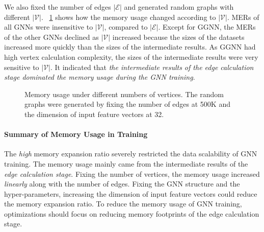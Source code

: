 We also fixed the number of edges $|\mathcal{E}|$ and generated random graphs with different $|\mathcal{V}|$.
%
\figurename~\ref{fig:exp_memory_expansion_ratio_input_graph_number_of_vertices_fixed_edge} shows how the memory usage changed according to $|\mathcal{V}|$.
%
MERs of all GNNs were insensitive to $|\mathcal{V}|$, compared to $|\mathcal{E}|$.
%
Except for GGNN, the MERs of the other GNNs declined as $|\mathcal{V}|$ increased because the sizes of the datasets increased more quickly than the sizes of the intermediate results.
%
As GGNN had high vertex calculation complexity, the sizes of the intermediate results were very sensitive to $|\mathcal{V}|$.
%
It indicated that \emph{the intermediate results of the edge calculation stage dominated the memory usage during the GNN training}.

\begin{figure}[H]
    \centering
    \caption{Memory usage under different numbers of vertices. The random graphs were generated by fixing the number of edges at 500K and the dimension of input feature vectors at 32.}
    \label{fig:exp_memory_expansion_ratio_input_graph_number_of_vertices_fixed_edge}
\end{figure}

\paragraph{Summary of Memory Usage in Training}
%
The \emph{high} memory expansion ratio severely restricted the data scalability of GNN training.
%
The memory usage mainly came from the intermediate results of the \emph{edge calculation stage}.
%
Fixing the number of vertices, the memory usage increased \emph{linearly} along with the number of edges.
%
Fixing the GNN structure and the hyper-parameters, increasing the dimension of input feature vectors could reduce the memory expansion ratio.
%
To reduce the memory usage of GNN training, optimizations should focus on reducing memory footprints of the edge calculation stage.

